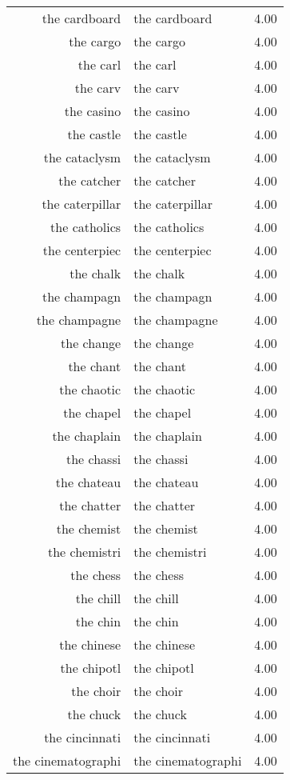 \begin{table}[ht]
\begin{tabular}{rlr}
  the cardboard & the cardboard & 4.00 \\ 
  the cargo & the cargo & 4.00 \\ 
  the carl & the carl & 4.00 \\ 
  the carv & the carv & 4.00 \\ 
  the casino & the casino & 4.00 \\ 
  the castle & the castle & 4.00 \\ 
  the cataclysm & the cataclysm & 4.00 \\ 
  the catcher & the catcher & 4.00 \\ 
  the caterpillar & the caterpillar & 4.00 \\ 
  the catholics & the catholics & 4.00 \\ 
  the centerpiec & the centerpiec & 4.00 \\ 
  the chalk & the chalk & 4.00 \\ 
  the champagn & the champagn & 4.00 \\ 
  the champagne & the champagne & 4.00 \\ 
  the change & the change & 4.00 \\ 
  the chant & the chant & 4.00 \\ 
  the chaotic & the chaotic & 4.00 \\ 
  the chapel & the chapel & 4.00 \\ 
  the chaplain & the chaplain & 4.00 \\ 
  the chassi & the chassi & 4.00 \\ 
  the chateau & the chateau & 4.00 \\ 
  the chatter & the chatter & 4.00 \\ 
  the chemist & the chemist & 4.00 \\ 
  the chemistri & the chemistri & 4.00 \\ 
  the chess & the chess & 4.00 \\ 
  the chill & the chill & 4.00 \\ 
  the chin & the chin & 4.00 \\ 
  the chinese & the chinese & 4.00 \\ 
  the chipotl & the chipotl & 4.00 \\ 
  the choir & the choir & 4.00 \\ 
  the chuck & the chuck & 4.00 \\ 
  the cincinnati & the cincinnati & 4.00 \\ 
  the cinematographi & the cinematographi & 4.00 \\ 

\end{tabular}
\end{table}
